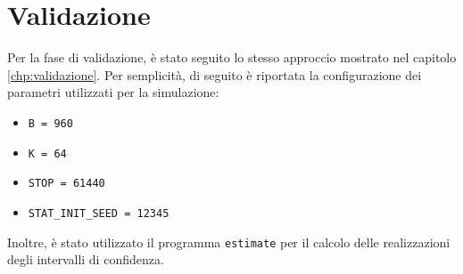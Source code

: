 \section{Validazione}\label{sec:miglioria-validazione}
Per la fase di validazione, è stato seguito lo stesso approccio mostrato nel capitolo \ref{chp:validazione}. Per semplicità, di seguito è riportata la configurazione dei parametri utilizzati per la simulazione:
\begin{itemize}
\item \texttt{B = 960}
\item \texttt{K = 64}
\item \texttt{STOP = 61440}
\item \texttt{STAT\_INIT\_SEED = 12345}
\end{itemize}
Inoltre, è stato utilizzato il programma \texttt{estimate} per il calcolo delle realizzazioni degli intervalli di confidenza.

